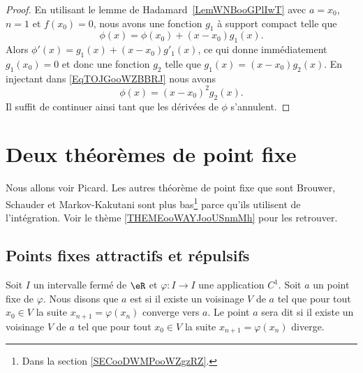 \begin{proof}
	En utilisant le lemme de Hadamard~\ref{LemWNBooGPlIwT} avec \( a=x_0\), \( n=1\) et \( f(x_0)=0\), nous avons une fonction \( g_1\) à support compact telle que
	\begin{equation}        \label{EqTOJGooWZBBRJ}
		\phi(x)=\phi(x_0)+(x-x_0)g_1(x).
	\end{equation}
	Alors \( \phi'(x)=g_1(x)+(x-x_0)g'_1(x)\), ce qui donne immédiatement \( g_1(x_0)=0\) et donc une fonction \( g_2\) telle que \( g_1(x)=(x-x_0)g_2(x)\). En injectant dans \eqref{EqTOJGooWZBBRJ} nous avons
	\begin{equation}
		\phi(x)=(x-x_0)^2g_2(x).
	\end{equation}
	Il suffit de continuer ainsi tant que les dérivées de \( \phi\) s'annulent.
\end{proof}

\section{Deux théorèmes de point fixe}

Nous allons voir Picard. Les autres théorème de point fixe que sont Brouwer, Schauder et Markov-Kakutani sont plus bas\footnote{Dans la section \ref{SECooDWMPooWZgzRZ}.} parce qu'ils utilisent de l'intégration. Voir le thème \ref{THEMEooWAYJooUSnmMh} pour les retrouver.

\subsection{Points fixes attractifs et répulsifs}

\begin{definition}      \label{DEFooTMZUooMoBDGC}
	Soit \( I\) un intervalle fermé de \( \eR\) et \( \varphi\colon I\to I\) une application \( C^1\). Soit \( a\) un point fixe de \( \varphi\). Nous disons que \( a\) est  si il existe un voisinage \( V\) de \( a\) tel que pour tout \( x_0\in V\) la suite \( x_{n+1}=\varphi(x_n)\) converge vers \( a\). Le point \( a\) sera dit  si il existe un voisinage \( V\) de \( a\) tel que pour tout \( x_0\in V\) la suite \( x_{n+1}=\varphi(x_n)\) diverge.
\end{definition}

